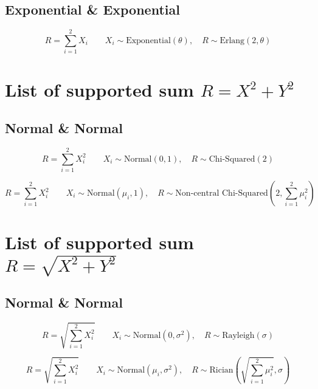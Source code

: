 \subsection{Exponential \& Exponential}

    \begin{equation}
        R = \sum_{i=1}^2 X_i \qquad 
        X_i \sim \text{Exponential}(\theta), \quad 
        R \sim \text{Erlang}\left(2, \theta \right)
    \end{equation}


\section{List of supported sum $R = X^2 + Y^2$}
\subsection{Normal \& Normal}

\begin{equation}
    R = \sum_{i=1}^2 X_i^2 \qquad 
    X_i \sim \text{Normal}(0,1), \quad 
    R \sim \text{Chi-Squared}\left( 2 \right)
\end{equation}

\begin{equation}
    R = \sum_{i=1}^2 X_i^2 \qquad 
    X_i \sim \text{Normal}(\mu_i,1), \quad 
    R \sim \text{Non-central Chi-Squared}\left(2, \sum _{i=1}^{2}\mu _{i}^2\right)
\end{equation}


\section{List of supported sum $R = \sqrt{X^2 + Y^2}$}
\subsection{Normal \& Normal}

\begin{equation}
    R = \sqrt{ \sum_{i=1}^2 X_i^2 } \qquad 
    X_i \sim \text{Normal}(0,\sigma^2), \quad 
    R \sim \text{Rayleigh}\left( \sigma \right)
\end{equation}

\begin{equation}
    R = \sqrt{ \sum_{i=1}^2 X_i^2 } \qquad 
    X_i \sim \text{Normal}(\mu_i,\sigma^2), \quad 
    R \sim \text{Rician}\left(\sqrt{\sum _{i=1}^{2}\mu _{i}^2}, \sigma \right)
\end{equation}



